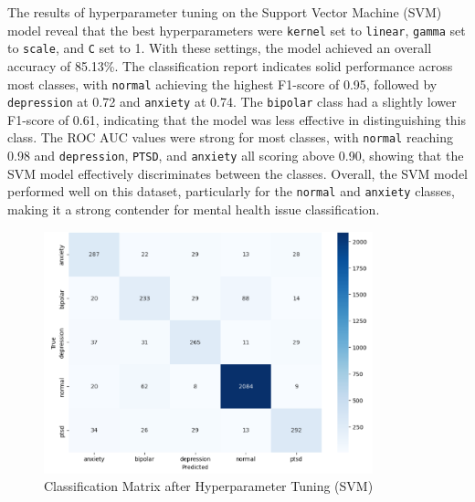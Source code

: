 \noindent
The results of hyperparameter tuning on the Support Vector Machine (SVM) model reveal that the best hyperparameters were \texttt{kernel} set to \texttt{linear}, \texttt{gamma} set to \texttt{scale}, and \texttt{C} set to 1. With these settings, the model achieved an overall accuracy of 85.13\%. The classification report indicates solid performance across most classes, with \texttt{normal} achieving the highest F1-score of 0.95, followed by \texttt{depression} at 0.72 and \texttt{anxiety} at 0.74. The \texttt{bipolar} class had a slightly lower F1-score of 0.61, indicating that the model was less effective in distinguishing this class. The ROC AUC values were strong for most classes, with \texttt{normal} reaching 0.98 and \texttt{depression}, \texttt{PTSD}, and \texttt{anxiety} all scoring above 0.90, showing that the SVM model effectively discriminates between the classes. Overall, the SVM model performed well on this dataset, particularly for the \texttt{normal} and \texttt{anxiety} classes, making it a strong contender for mental health issue classification.

\begin{figure}[h!]  
    \centering
    \includegraphics[width=0.85\textwidth]{Images/HP SVM CM.png}  
    \caption{Classification Matrix after Hyperparameter Tuning (SVM)}
    \label{LSTMROC6}  %
\end{figure}

